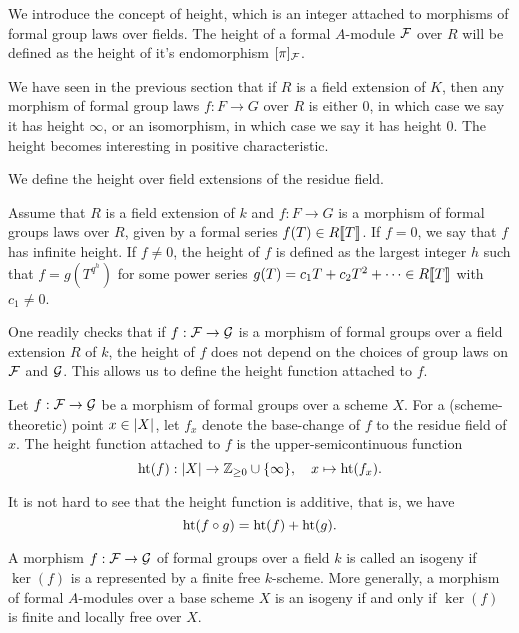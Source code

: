 We introduce the concept of height, which is an integer attached to
morphisms of formal group laws over fields. The height of a formal $A$-module
$\mathcal{F}$ over $R$ will be defined as the height of it's endomorphism $[\pi]_{\mathcal{F}}$. 

We have seen in the previous section that if $R$ is a field extension of $K$,
then any morphism of formal group laws $f: F \to G$ over $R$ is either $0$, in
which case we say it has height $\infty$, or an isomorphism, in which case we
say it has height $0$. The height becomes interesting in positive
characteristic. 

We define the height over field extensions of the residue field. 
\begin{defi}
  Assume that $R$ is a field extension of $k$ and $f: F \to G$ is a morphism of 
  formal groups laws over $R$, given by a formal series $f(T) \in R\llbracket T \rrbracket$. 
  If $f = 0$, we say that $f$ has infinite height. 
  If $f \neq 0$, the height of $f$ is defined as the largest integer $h$ such that 
  $f = g(T^{q^h})$ for some power series $g(T) = c_1 T + c_2 T^2 + \dots \in R\llbracket T \rrbracket$
  with $c_1 \neq 0$. 
\end{defi}
One readily checks that if $f: \mathcal{F} \to \mathcal{G}$ is a morphism of formal groups over
a field extension $R$ of $k$, the height of $f$ does not depend on the choices
of group laws on $\mathcal{F}$ and $\mathcal{G}$. This allows us to define the height function 
attached to $f$. 
\begin{defi}
  Let $f: \mathcal{F} \to \mathcal{G}$ be a morphism of formal groups over a scheme $X$.
  For a (scheme-theoretic) point $x \in \lvert X \rvert$, let $f_x$ denote the 
  base-change of $f$ to the residue field of $x$. 
  The height function attached to $f$ is the upper-semicontinuous function
  \begin{equation} \label{eq:defheight}
    \textnormal{ht}(f) : \lvert X \rvert \to \mathbb{Z}_{\geq 0} \cup \{\infty\}, \quad x \mapsto 
    \textnormal{ht}(f_x).
  \end{equation}
\end{defi}
It is not hard to see that the height function is additive, that is, we have
\begin{equation*}
  \textnormal{ht}(f \circ g) = \textnormal{ht}(f) + \textnormal{ht}(g).
\end{equation*}

\begin{defi}[Isogeny]
  A morphism $f: \mathcal{F} \to \mathcal{G}$ of formal groups over a field $k$ is called an isogeny if
  $\ker(f)$ is a represented by a finite free $k$-scheme. More generally, a
  morphism of formal $A$-modules over a base scheme $X$ is an isogeny if and
  only if $\ker(f)$ is finite and locally free over $X$. 
\end{defi}

